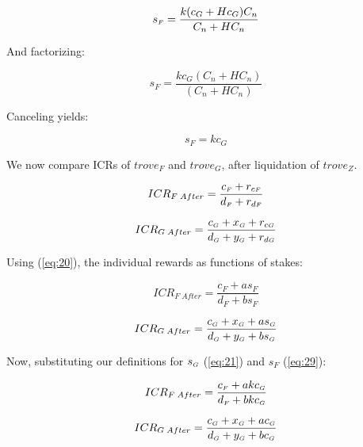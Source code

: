 \documentclass[reqno]{article}
\begin{document}
\begin{equation} 
    s_\mathsmaller{F}=\frac{k(c_G+Hc_G)C_n}{C_n+HC_n}
\end{equation}

\bigskip
And factorizing:

\begin{equation} 
    s_F=\frac{kc_G(C_n+HC_n)}{(C_n+HC_n)}
\end{equation}

\bigskip
Canceling yields:

\begin{equation} \label{eq:29}
    s_F=kc_G
\end{equation}

\bigskip
We now compare ICRs of $trove_F$ and $trove_G$, after liquidation of $trove_Z$.

\begin{equation} 
    ICR_{F \; After}=\frac{c_\mathsmaller{F}+r_{c\mathsmaller{F}}}{d_\mathsmaller{F}+r_{d\mathsmaller{F}}}
\end{equation}

\begin{equation} 
    ICR_{G \; After}=\frac{c_\mathsmaller{G}+x_\mathsmaller{G}+r_{c\mathsmaller{G}}}{d_\mathsmaller{G}+y_\mathsmaller{G}+r_{d\mathsmaller{G}}}
\end{equation}

\bigskip
Using (\ref{eq:20}), the individual rewards as functions of stakes:

\begin{equation} 
    ICR_{F \; After}=\frac{c_F+as_F}{d_F+bs_F}
\end{equation}

\begin{equation} 
    ICR_{G \; After}=\frac{c_\mathsmaller{G}+x_\mathsmaller{G}+as_\mathsmaller{G}}{d_\mathsmaller{G}+y_\mathsmaller{G}+bs_\mathsmaller{G}}
\end{equation}

\bigskip
Now, substituting our definitions for $s_\mathsmaller{G}$ (\ref{eq:21}) and $s_F$ (\ref{eq:29}):

\begin{equation} 
    ICR_{F \; After}=\frac{c_\mathsmaller{F}+akc_\mathsmaller{G}}{d_\mathsmaller{F}+bkc_\mathsmaller{G}}
\end{equation}

\begin{equation} 
    ICR_{G \; After}=\frac{c_\mathsmaller{G}+x_\mathsmaller{G}+ac_\mathsmaller{G}}{d_\mathsmaller{G}+y_\mathsmaller{G}+bc_\mathsmaller{G}}
\end{equation}
\end{document}
